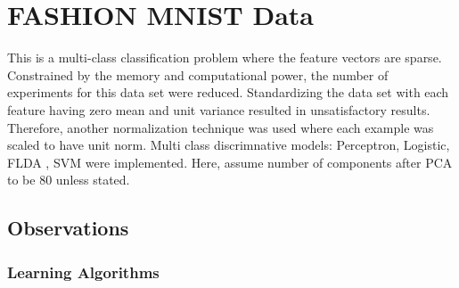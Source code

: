 \documentclass[12pt,journal,compsoc]{IEEEtran}
\begin{document}
\section{FASHION MNIST Data}

\noindent This is a multi-class classification problem where the feature vectors are sparse. Constrained by the memory and computational power, the number of experiments for this data set were reduced. Standardizing the data set with each feature having zero mean and unit variance resulted in unsatisfactory results. Therefore, another normalization technique was used where each example was scaled to have unit norm. Multi class discrimnative models: Perceptron, Logistic, FLDA , SVM were implemented. Here, assume number of components after PCA to be 80 unless stated.  

\subsection{Observations}

\subsubsection{Learning Algorithms}
\end{document}
